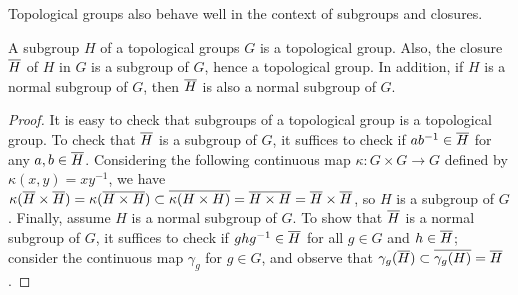Topological groups also behave well in the context of subgroups and closures.
\begin{prop}
    A subgroup $H$ of a topological groups $G$ is a topological group.
    Also, the closure $\overline{H}$ of $H$ in $G$ is a subgroup of $G$, hence a topological group.
    In addition, if $H$ is a normal subgroup of $G$, then $\overline{H}$ is also a normal subgroup of $G$.
\end{prop}
\begin{proof}
    It is easy to check that subgroups of a topological group is a topological group.
    To check that $\overline{H}$ is a subgroup of $G$, it suffices to check if $ab^{-1}\in\overline{H}$ for any $a, b\in\overline{H}$.
    Considering the following continuous map $\kappa: G\times G\rightarrow G$ defined by $\kappa(x, y)=xy^{-1}$, we have $\kappa(\overline{H}\times\overline{H})=\kappa(\overline{H\times H})\subset\overline{\kappa(H\times H)}=\overline{H\times H}=\overline{H}\times\overline{H}$, so $H$ is a subgroup of $G$.
    Finally, assume $H$ is a normal subgroup of $G$.
    To show that $\overline{H}$ is a normal subgroup of $G$, it suffices to check if $ghg^{-1}\in \overline{H}$ for all $g\in G$ and $h\in\overline{H}$; consider the continuous map $\gamma_g$ for $g\in G$, and observe that $\gamma_g(\overline{H})\subset\overline{\gamma_g(H)}=\overline{H}$.
\end{proof}

